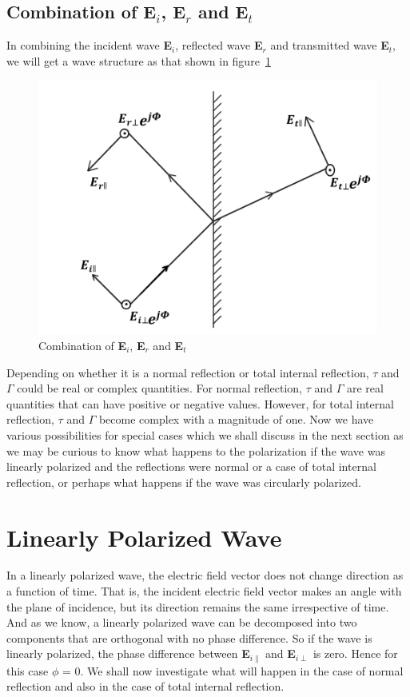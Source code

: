\subsection{Combination of \textbf{E$_i$}, \textbf{E$_r$} and \textbf{E$_t$}}
In combining the incident wave \textbf{E$_i$}, reflected wave \textbf{E$_r$} and transmitted wave \textbf{E$_t$}, we will get a wave structure as that shown in figure~\ref{fig:mcben}	
\begin{figure}[h]
\centering
\includegraphics[width=1\linewidth]{graphics/orthogonal_components}
\caption{Combination of \textbf{E$_i$}, \textbf{E$_r$} and \textbf{E$_t$}}
\label{fig:mcben}
\end{figure}

Depending on whether it is a normal reflection or total internal reflection, $\tau$ and $\Gamma$ could be real or complex quantities. For normal reflection, $\tau$ and $\Gamma$ are real quantities that can have positive or negative values. However, for total internal reflection, $\tau$ and $\Gamma$ become complex with a magnitude of one. Now we have various possibilities for special cases which we shall discuss in the next section as we may be curious to know what happens to the polarization if the wave was linearly polarized and the reflections were normal or a case of total internal reflection, or perhaps what happens if the wave was circularly polarized.

\section{Linearly Polarized Wave}
In a linearly polarized wave, the electric field vector does not change direction as a function of time. That is, the incident electric field vector makes an angle with the plane of incidence, but its direction remains the same irrespective of time. And as we know, a linearly polarized wave can be decomposed into two components that are orthogonal with no phase difference. So if the wave is linearly polarized, the phase difference between \textbf{E}$_{i\parallel}$ and \textbf{E}$_{i\perp}$ is zero. Hence for this case $\phi$ = 0. We shall now investigate what will happen in the case of normal reflection and also in the case of total internal reflection.

